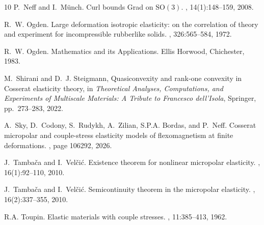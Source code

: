 \documentclass[11pt]{article}
\begin{document}
\begin{footnotesize}
\begin{thebibliography}{10}
P.~Neff and I.~M\"unch.
\newblock Curl bounds {Grad} on {${\mathrm{SO}}(3)$}.
,
  14(1):148--159, 2008.

R.~W. Ogden.
\newblock Large deformation isotropic elasticity: on the correlation of theory
  and experiment for incompressible rubberlike solids.
,
  326:565--584, 1972.

R.~W. Ogden.
\newblock Mathematics and its Applications. Ellis Horwood, Chichester, 1983.


 M.~Shirani and D.~J. Steigmann, \newblock Quasiconvexity and rank-one convexity in Cosserat elasticity theory, \newblock in \emph{Theoretical Analyses, Computations, and Experiments of Multiscale Materials: A Tribute to Francesco dell'Isola}, \newblock Springer, pp.~273--283, 2022.

A.~Sky, D.~Codony, S.~Rudykh, A.~Zilian, S.P.A. Bordas, and P.~Neff.
\newblock Cosserat micropolar and couple-stress elasticity models of
  flexomagnetism at finite deformations.
, page 106292, 2026.

J.~Tamba{\v c}a and I.~Vel{\v c}i{\'c}.
\newblock Existence theorem for nonlinear micropolar elasticity.
,
  16(1):92--110, 2010.

J.~Tamba{\v c}a and I.~Vel{\v c}i{\'c}.
\newblock Semicontinuity theorem in the micropolar elasticity.
,
  16(2):337--355, 2010.

R.A. Toupin.
\newblock Elastic materials with couple stresses.
, 11:385--413, 1962.

\end{thebibliography}

 \end{footnotesize}
\end{document}
